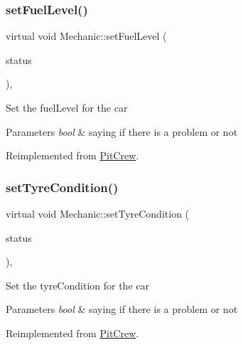 \subsubsection{\texorpdfstring{set\+Fuel\+Level()}{setFuelLevel()}}
{\footnotesize\ttfamily virtual void Mechanic\+::set\+Fuel\+Level (\begin{DoxyParamCaption}\item[{bool}]{status }\end{DoxyParamCaption})\hspace{0.3cm}{\ttfamily [inline]}, {\ttfamily [virtual]}}

Set the fuel\+Level for the car 
\begin{DoxyParams}{Parameters}
{\em bool} & saying if there is a problem or not \\
\hline
\end{DoxyParams}


Reimplemented from \mbox{\hyperlink{class_pit_crew_a8c137bb619ab3a331f4f1d7023477e4b}{Pit\+Crew}}.

\mbox{\label{class_mechanic_a9ca7c0e50fe3bdc27f9f8f2273968ddc}} 
\subsubsection{\texorpdfstring{set\+Tyre\+Condition()}{setTyreCondition()}}
{\footnotesize\ttfamily virtual void Mechanic\+::set\+Tyre\+Condition (\begin{DoxyParamCaption}\item[{bool $\ast$}]{status }\end{DoxyParamCaption})\hspace{0.3cm}{\ttfamily [inline]}, {\ttfamily [virtual]}}

Set the tyre\+Condition for the car 
\begin{DoxyParams}{Parameters}
{\em bool} & saying if there is a problem or not \\
\hline
\end{DoxyParams}


Reimplemented from \mbox{\hyperlink{class_pit_crew_a281583ec0986aeec56fc70dd362fa31c}{Pit\+Crew}}.

\mbox{\label{class_mechanic_a405ddcc5b6e6f0194c33af4972cdec5d}} 
